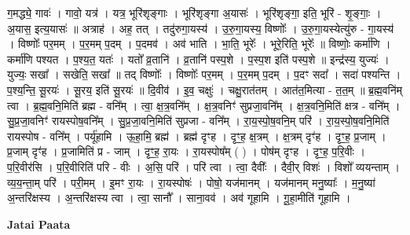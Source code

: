 \documentclass[17pt]{extarticle}
\begin{document}
ग॒मद्ध्ये॒ गावः॑ । गावो॒ यत्र॑ । यत्र॒ भूरि॑शृङ्गाः । भूरि॑शृङ्गा अ॒यासः॑ । भूरि॑शृङ्गा॒ इति॒ भूरि॑ - शृ॒ङ्गाः॒ । अ॒यास॒ इत्य॒यासः॑ ॥ अत्राह॑ । अह॒ तत् । तदु॑रुगा॒यस्य॑ । उ॒रु॒गा॒यस्य॒ विष्णोः᳚ । उ॒रु॒गा॒यस्येत्यु॑रु - गा॒यस्य॑ । विष्णोः᳚ पर॒मम् । प॒र॒मम् प॒दम् । प॒दमव॑ । अव॑ भाति । भा॒ति॒ भूरेः᳚ । भूरे॒रिति॒ भूरेः᳚ ॥ विष्णोः॒ कर्मा॑णि । कर्मा॑णि पश्यत । प॒श्य॒त॒ यतः॑ । यतो᳚ व्र॒तानि॑ । व्र॒तानि॑ पस्प॒शे । प॒स्प॒श इति॑ पस्प॒शे ॥ इन्द्र॑स्य॒ युज्यः॑ । युज्यः॒ सखा᳚ । सखेति॒ सखा᳚ ॥ तद् विष्णोः᳚ । विष्णोः᳚ पर॒मम् । प॒र॒मम् प॒दम् । प॒दꣳ सदा᳚ । सदा॑ पश्यन्ति । प॒श्य॒न्ति॒ सू॒रयः॑ । सू॒रय॒ इति॑ सू॒रयः॑ ॥ दि॒वीव॑ । इ॒व॒ चक्षुः॑ । चक्षु॒रात॑तम् । आत॑त॒मित्या - त॒त॒म् ॥ ब्र॒ह्म॒वनि॑म् त्वा । ब्र॒ह्म॒वनि॒मिति॑ ब्रह्म - वनि᳚म् । त्वा॒ क्ष॒त्र॒वनि᳚म् । क्ष॒त्र॒वनिꣳ॑ सुप्रजा॒वनि᳚म् । क्ष॒त्र॒वनि॒मिति॑ क्षत्र - वनि᳚म् । सु॒प्र॒जा॒वनिꣳ॑ रायस्पोष॒वनि᳚म् । सु॒प्र॒जा॒वनि॒मिति॑ सुप्रजा - वनि᳚म् । रा॒य॒स्पो॒ष॒वनि॒म् परि॑ । रा॒य॒स्पो॒ष॒वनि॒मिति॑ रायस्पोष - वनि᳚म् । पर्यू॑हामि । ऊ॒हा॒मि॒ ब्रह्म॑ । ब्रह्म॑ दृꣳह । दृꣳ॒॒ह॒ क्ष॒त्रम् । क्ष॒त्रम् दृꣳ॑ह । दृꣳ॒॒ह॒ प्र॒जाम् । प्र॒जाम् दृꣳ॑ह । प्र॒जामिति॑ प्र - जाम् । दृꣳ॒॒ह॒ रा॒यः । रा॒यस्पोष᳚म् ( ) । पोष॑म् दृꣳह । दृꣳ॒॒ह॒ प॒रि॒वीः । प॒रि॒वीर॑सि । प॒रि॒वीरिति॑ परि - वीः । अ॒सि॒ परि॑ । परि॑ त्वा । त्वा॒ दैवीः᳚ । दैवी॒र् विशः॑ । विशो᳚ व्ययन्ताम् । व्य॒य॒न्ता॒म् परि॑ । परी॒मम् । इ॒मꣳ रा॒यः । रा॒यस्पोषः॑ । पोषो॒ यज॑मानम् । यज॑मानम् मनु॒ष्याः᳚ । म॒नु॒ष्या॑ अ॒न्तरि॑क्षस्य । अ॒न्तरि॑क्षस्य त्वा । त्वा॒ सानौ᳚ । साना॒वव॑ । अव॑ गूहामि । गू॒हा॒मीति॑ गूहामि । \newline

\textbf{Jatai Paata} \newline
\end{document}
